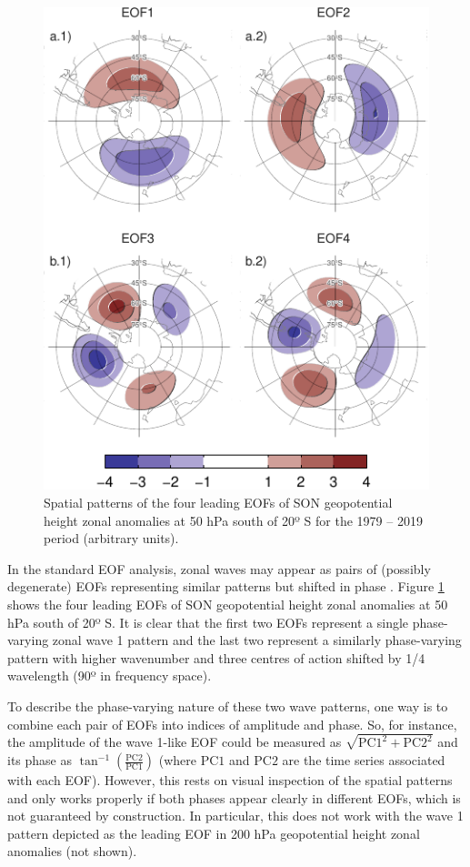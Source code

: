 \documentclass[pdflatex,lineno,sn-basic]{sn-jnl}
\theoremstyle{thmstyleone}%
\theoremstyle{thmstyletwo}%
\theoremstyle{thmstylethree}%
\begin{document}
\begin{figure}
\centering
\includegraphics{shceof_files/figure-latex/eof-naive-1.pdf}
\caption{\label{fig:eof-naive}Spatial patterns of the four leading EOFs of SON geopotential height zonal anomalies at 50 hPa south of 20º S for the 1979 -- 2019 period (arbitrary units).}
\end{figure}

In the standard EOF analysis, zonal waves may appear as pairs of (possibly degenerate) EOFs representing similar patterns but shifted in phase \citep{horel1984}.
Figure \ref{fig:eof-naive} shows the four leading EOFs of SON geopotential height zonal anomalies at 50 hPa south of 20º S.
It is clear that the first two EOFs represent a single phase-varying zonal wave 1 pattern and the last two represent a similarly phase-varying pattern with higher wavenumber and three centres of action shifted by 1/4 wavelength (90º in frequency space).

To describe the phase-varying nature of these two wave patterns, one way is to combine each pair of EOFs into indices of amplitude and phase.
So, for instance, the amplitude of the wave 1-like EOF could be measured as \(\sqrt{\mathrm{PC1}^2 + \mathrm{PC2}^2}\) and its phase as \(\tan^{-1} \left ( \frac{\mathrm{PC2}}{\mathrm{PC1}} \right )\) (where \(\mathrm{PC1}\) and \(\mathrm{PC2}\) are the time series associated with each EOF).
However, this rests on visual inspection of the spatial patterns and only works properly if both phases appear clearly in different EOFs, which is not guaranteed by construction.
In particular, this does not work with the wave 1 pattern depicted as the leading EOF in 200 hPa geopotential height zonal anomalies (not shown).
\end{document}
